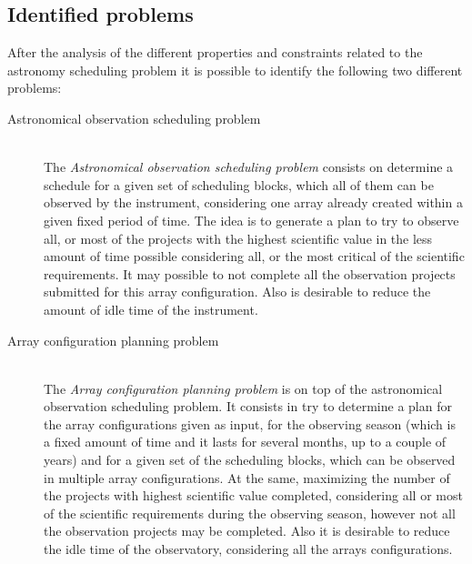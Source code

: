\subsection{Identified problems}
\label{sec:problems}
After the analysis of the different properties and constraints related to the astronomy scheduling problem it is possible to identify the following two different problems:
\begin{description}

\item[Astronomical observation scheduling problem] \hfill \\
The \textit{Astronomical observation scheduling problem} consists on determine a schedule for a given set of scheduling blocks, which all of them can be observed by the instrument, considering one array already created within a given fixed period of time. 
The idea is to generate a plan to try to observe all, or most of the projects with the highest scientific value in the less amount of time possible considering all, or the most critical of the scientific requirements. It may possible to not complete all the observation projects submitted for this array configuration. Also is desirable to reduce the amount of idle time of the instrument.

\item[Array configuration planning problem] \hfill \\
The \textit{Array configuration planning problem} is on top of the astronomical observation scheduling problem. It consists in try to determine a plan for the array configurations given as input, for the observing season (which is a fixed amount of time and it lasts for several months, up to a couple of years) and for a given set of the scheduling blocks, which can be observed in multiple array configurations. At the same, maximizing the number of the projects with highest scientific value completed, considering all or most of the scientific requirements during the observing season, however not all the observation projects may be completed. Also it is desirable to reduce the idle time of the observatory, considering all the arrays configurations.
\end{description}


